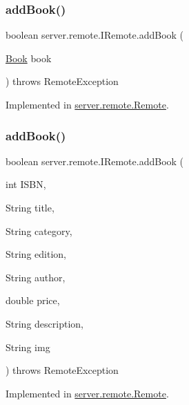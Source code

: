 \subsubsection{\texorpdfstring{add\+Book()}{addBook()}\hspace{0.1cm}{\footnotesize\ttfamily [1/2]}}
{\footnotesize\ttfamily boolean server.\+remote.\+I\+Remote.\+add\+Book (\begin{DoxyParamCaption}\item[{\hyperlink{classserver_1_1data_1_1_book}{Book}}]{book }\end{DoxyParamCaption}) throws Remote\+Exception}



Implemented in \hyperlink{classserver_1_1remote_1_1_remote_a496fcecd259c1b527ffba62fc452afee}{server.\+remote.\+Remote}.

\mbox{\label{interfaceserver_1_1remote_1_1_i_remote_aec137a7435ccced1aa7350b2fd2a1947}} 
\subsubsection{\texorpdfstring{add\+Book()}{addBook()}\hspace{0.1cm}{\footnotesize\ttfamily [2/2]}}
{\footnotesize\ttfamily boolean server.\+remote.\+I\+Remote.\+add\+Book (\begin{DoxyParamCaption}\item[{int}]{I\+S\+BN,  }\item[{String}]{title,  }\item[{String}]{category,  }\item[{String}]{edition,  }\item[{String}]{author,  }\item[{double}]{price,  }\item[{String}]{description,  }\item[{String}]{img }\end{DoxyParamCaption}) throws Remote\+Exception}



Implemented in \hyperlink{classserver_1_1remote_1_1_remote_afd807d8743560106c61a01094795c9cb}{server.\+remote.\+Remote}.

\mbox{\label{interfaceserver_1_1remote_1_1_i_remote_ab24486281e8c228ee82a48a5ca70297b}} 
